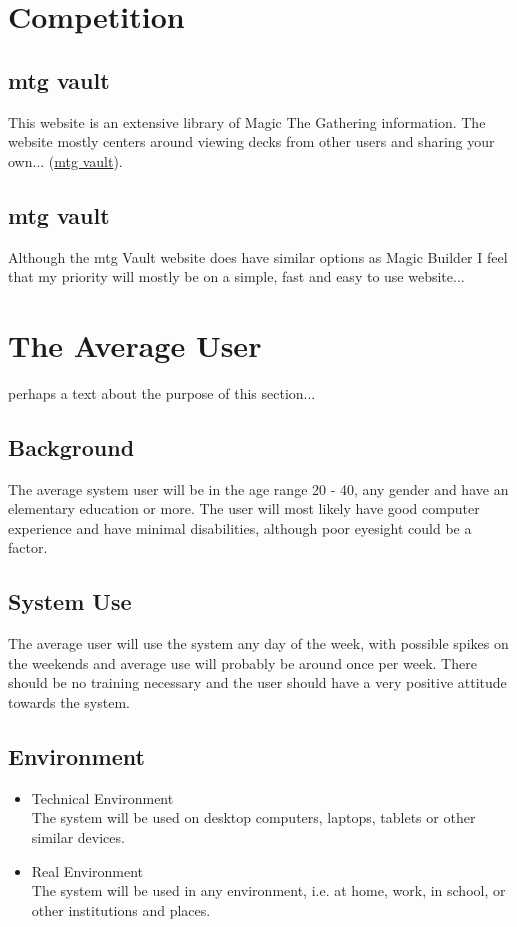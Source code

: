 \documentclass[paper=a4, fontsize=11pt]{scrartcl} %
\numberwithin{equation}{section} %
\numberwithin{figure}{section} %
\numberwithin{table}{section} %
\begin{document}
\section{Competition}
\subsection{mtg vault}
This website is an extensive library of Magic The Gathering information. The website mostly centers around viewing decks from other users and sharing your own...
(\href{http://www.mtgvault.com/}{mtg vault}).
\subsection{mtg vault}
Although the mtg Vault website does have similar options as Magic Builder I feel that my priority will mostly be on a simple, fast and easy to use website...

\section{The Average User}
perhaps a text about the purpose of this section...
\subsection{Background}
The average system user will be in the age range 20 - 40, any gender and have an elementary education or more. The user will most likely have good computer experience and have minimal disabilities, although poor eyesight could be a factor.
\subsection{System Use}
The average user will use the system any day of the week, with possible spikes on the weekends and average use will probably be around once per week. There should be no training necessary and the user should have a very positive attitude towards the system.
\subsection{Environment}
\begin{itemize}
  \item Technical Environment \\
  The system will be used on desktop computers, laptops, tablets or other similar devices.
  \item Real Environment \\
  The system will be used in any environment, i.e. at home, work, in school, or other institutions and places.
\end{itemize}
\end{document}
